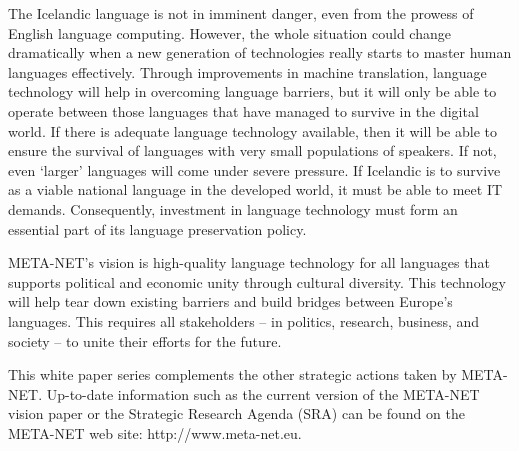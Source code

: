 \begin{multicols}{2}
The Icelandic language is not in imminent danger, even from the prowess of English language computing. However, the whole situation could change dramatically when a new generation of technologies really starts to master human languages effectively. Through improvements in machine translation, language technology will help in overcoming language barriers, but it will only be able to operate between those languages that have managed to survive in the digital world. If there is adequate language technology available, then it will be able to ensure the survival of languages with very small populations of speakers. If not, even ‘larger’ languages will come under severe pressure. If Icelandic is to survive as a viable national language in the developed world, it must be able to meet IT demands. Consequently, investment in language technology must form an essential part of its language preservation policy. 

META-NET’s vision is high-quality language technology for all languages that supports political and economic unity through cultural diversity. This technology will help tear down existing barriers and build bridges between Europe’s languages. This requires all stakeholders -- in politics, research, business, and society -- to unite their efforts for the future.

This white paper series complements the other strategic actions taken by META-NET. Up-to-date information such as the current version of the META-NET vision paper \cite{Meta1} or the Strategic Research Agenda (SRA) can be found on the META-NET web site: http://www.meta-net.eu.
\end{multicols}
\clearpage


